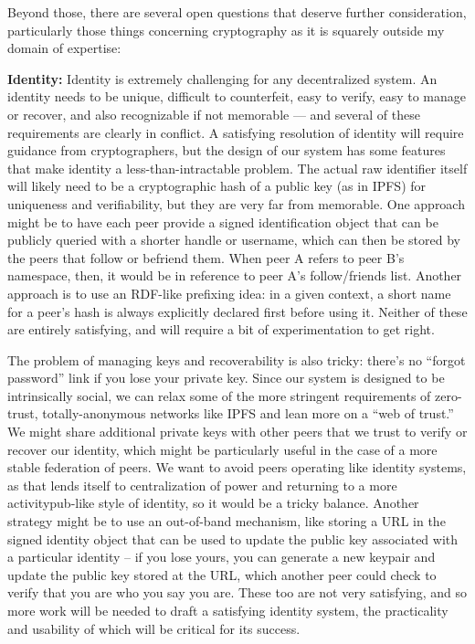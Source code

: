 Beyond those, there are several open questions that deserve further
consideration, particularly those things concerning cryptography as it
is squarely outside my domain of expertise:

\textbf{Identity:} Identity is extremely challenging for any
decentralized system. An identity needs to be unique, difficult to
counterfeit, easy to verify, easy to manage or recover, and also
recognizable if not memorable --- and several of these requirements are
clearly in conflict. A satisfying resolution of identity will require
guidance from cryptographers, but the design of our system has some
features that make identity a less-than-intractable problem. The actual
raw identifier itself will likely need to be a cryptographic hash of a
public key (as in IPFS) for uniqueness and verifiability, but they are
very far from memorable. One approach might be to have each peer provide
a signed identification object that can be publicly queried with a
shorter handle or username, which can then be stored by the peers that
follow or befriend them. When peer A refers to peer B's namespace,
then, it would be in reference to peer A's follow/friends list. Another
approach is to use an RDF-like prefixing idea: in a given context, a
short name for a peer's hash is always explicitly declared first before
using it. Neither of these are entirely satisfying, and will require a
bit of experimentation to get right.

The problem of managing keys and recoverability is also tricky: there's
no ``forgot password'' link if you lose your private key. Since our
system is designed to be intrinsically social, we can relax some of the
more stringent requirements of zero-trust, totally-anonymous networks
like IPFS and lean more on a ``web of trust.'' We might share additional
private keys with other peers that we trust to verify or recover our
identity, which might be particularly useful in the case of a more
stable federation of peers. We want to avoid peers operating like
identity systems, as that lends itself to centralization of power and
returning to a more activitypub-like style of identity, so it would be a
tricky balance. Another strategy might be to use an out-of-band
mechanism, like storing a URL in the signed identity object that can be
used to update the public key associated with a particular identity --
if you lose yours, you can generate a new keypair and update the public
key stored at the URL, which another peer could check to verify that you
are who you say you are. These too are not very satisfying, and so more
work will be needed to draft a satisfying identity system, the
practicality and usability of which will be critical for its success.


